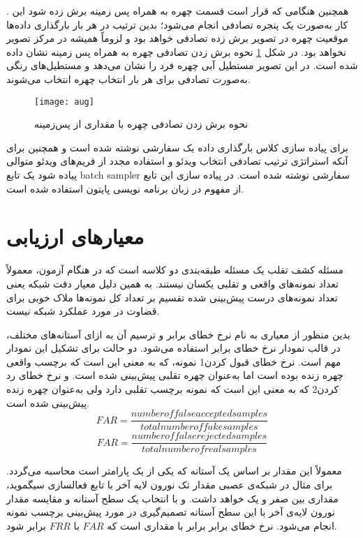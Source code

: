 \cite{zhong2020random}
. همچنین هنگامی که قرار است قسمت چهره به همراه پس زمینه برش زده شود این کار به‌صورت یک پنجره تصادفی انجام می‌شود؛ بدین ترتیب در هر بار بارگذاری داده‌ها موقعیت چهره در تصویر برش زده تصادفی خواهد بود و لزوماً همیشه در مرکز تصویر نخواهد بود.
در شکل  
\ref{fig:aug}
نحوه برش زدن تصادفی چهره به همراه پس زمینه نشان داده شده است. در این تصویر مستطیل آبی چهره فرد را نشان می‌دهد و مستطیل‌های رنگی به‌صورت تصادفی برای هر بار انتخاب چهره انتخاب می‌شوند. 
\begin{figure}[ht]
	\centerline{\texttt{[image: aug]}}
	\caption{نحوه برش زدن تصادفی چهره با مقداری از پس‌زمینه}
	\label{fig:aug}
\end{figure}

برای پیاده سازی کلاس بارگذاری داده یک
سفارشی نوشته شده است و همچنین برای آنکه استراتژی ترتیب تصادفی انتخاب ویدئو و استفاده مجدد از فریم‌های ویدئو متوالی پیاده شود یک تابع batch sampler سفارشی نوشته شده است. در پیاده سازی این تابع از مفهوم  در زبان برنامه نویسی پایتون استفاده شده است.
\section{معیارهای ارزیابی}
مسئله کشف تقلب یک مسئله طبقه‌بندی دو کلاسه است که در هنگام آزمون، معمولاً تعداد نمونه‌های واقعی و تقلبی یکسان نیستند. به همین دلیل معیار دقت شبکه یعنی تعداد نمونه‌های درست پیش‌بینی شده تقسیم بر تعداد کل نمونه‌ها ملاک خوبی برای قضاوت در مورد عملکرد شبکه نیست. 

بدین منظور از معیاری به نام نرخ خطای برابر و ترسیم آن به ازای آستانه‌های مختلف، در قالب نمودار نرخ خطای برابر استفاده می‌شود. 
دو حالت برای تشکیل این نمودار مهم است. نرخ خطای قبول کردن1 نمونه، که به معنی این است که برچسب واقعی چهره زنده بوده است اما به‌عنوان چهره تقلبی پیش‌بینی شده است. و نرخ خطای رد کردن2 که به معنی این است که نمونه برچسب تقلبی دارد ولی به‌عنوان چهره زنده پیش‌بینی شده است.
\begin{equation} \label{eq:far}
	FAR = \frac{number of false accepted samples}{total number of fake samples}
\end{equation}
\begin{equation} \label{eq:frr}
	FAR = \frac{number of false rejected samples}{total number of real samples}
\end{equation}

معمولاً این مقدار بر اساس یک آستانه که یکی از یک پارامتر است محاسبه می‌گردد. برای مثال در شبکه‌ی عصبی مقدار تک نورون لایه آخر با تابع فعالسازی سیگموید، مقداری بین صفر و یک خواهد داشت. و با انتخاب یک سطح آستانه و مقایسه مقدار نورون لایه‌ی آخر با این سطح آستانه تصمیم‌گیری در مورد پیش‌بینی برچسب نمونه انجام می‌شود. نرخ خطای برابر برابر با مقداری است که $FAR$ با $FRR$ برابر شود.

